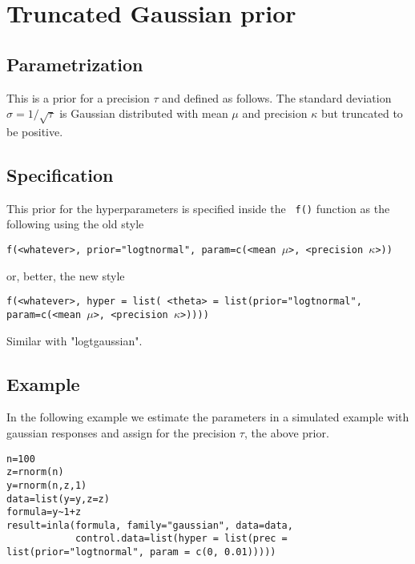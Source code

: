 \documentclass[a4paper,11pt]{article}
\begin{document}
\section*{Truncated Gaussian prior}

\subsection*{Parametrization}
This is a prior for a precision $\tau$ and defined as follows.  The
standard deviation $\sigma = 1/\sqrt{\tau}$ is Gaussian distributed
with mean $\mu$ and precision $\kappa$ but truncated to be positive.

\subsection*{Specification}
This prior for the hyperparameters is specified inside the {\tt
    f()} function as the following using the old style
\begin{center}
    {\tt f(<whatever>, prior="logtnormal", param=c(<mean $\mu$>, <precision $\kappa$>))}
\end{center}
or, better, the new style
\begin{center}
    {\tt f(<whatever>, hyper = list( <theta> = list(prior="logtnormal", param=c(<mean $\mu$>, <precision $\kappa$>))))}
\end{center}
Similar with "logtgaussian".

\subsection*{Example}

In the following example we estimate the parameters in a simulated
example with gaussian responses and assign for the precision
$\tau$, the above prior.
\begin{verbatim}
n=100
z=rnorm(n)
y=rnorm(n,z,1)
data=list(y=y,z=z)
formula=y~1+z
result=inla(formula, family="gaussian", data=data,
            control.data=list(hyper = list(prec = list(prior="logtnormal", param = c(0, 0.01)))))
\end{verbatim}
\end{document}
